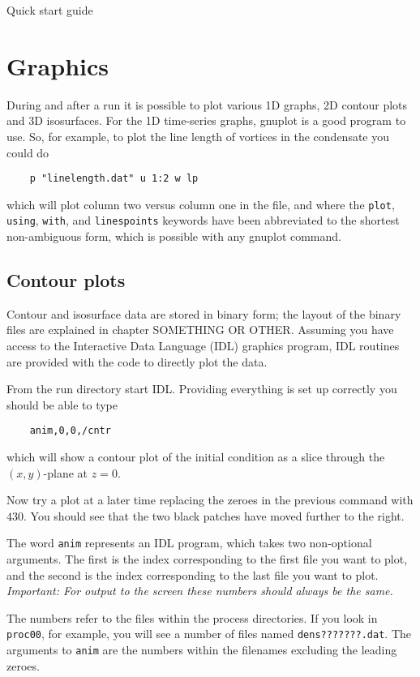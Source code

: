 \begin{chapter}{\label{cha:quickstart} Quick start guide}
  \section{Graphics}
  During and after a run it is possible to plot various 1D graphs, 2D contour
  plots and 3D isosurfaces.  For the 1D time-series graphs, gnuplot is a good
  program to use.  So, for example, to plot the line length of vortices in the
  condensate you could do
  \begin{Verbatim}
    p "linelength.dat" u 1:2 w lp
  \end{Verbatim}
  which will plot column two versus column one in the file, and where the
  \verb"plot", \verb"using", \verb"with", and \verb"linespoints" keywords have
  been abbreviated to the shortest non-ambiguous form, which is possible with
  any gnuplot command.

  \subsection{Contour plots}
  Contour and isosurface data are stored in binary form; the layout of the
  binary files are explained in chapter SOMETHING OR OTHER.  Assuming you have
  access to the Interactive Data Language (IDL) graphics program, IDL routines
  are provided with the code to directly plot the data.

  From the run directory start IDL.  Providing everything is set up correctly
  you should be able to type
  \begin{Verbatim}
    anim,0,0,/cntr
  \end{Verbatim}
  which will show a contour plot of the initial condition as a slice through
  the $(x,y)$-plane at $z=0$.

  Now try a plot at a later time replacing the zeroes in the previous command
  with $430$.  You should see that the two black patches have moved further to
  the right.

  The word \verb"anim" represents an IDL program, which takes two non-optional
  arguments.  The first is the index corresponding to the first file you want
  to plot, and the second is the index corresponding to the last file you want
  to plot.  \emph{Important: For output to the screen these numbers should
  always be the same.}

  The numbers refer to the files within the process directories.  If you look
  in \verb"proc00", for example, you will see a number of files named
  \verb"dens???????.dat".  The arguments to \verb"anim" are the numbers within
  the filenames excluding the leading zeroes.


\end{chapter}
